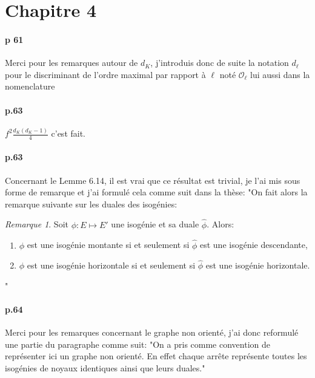 \documentclass[10pt,a4paper]{article}
\theoremstyle{plain}
\theoremstyle{definition}
\theoremstyle{definition}
\theoremstyle{definition}
\theoremstyle{definition}
\theoremstyle{definition}
\theoremstyle{remark}
\newtheorem{rem}[thm]{Remarque}
\theoremstyle{remark}
\theoremstyle{definition}
\begin{document}
\section{Chapitre 4}

\paragraph{p 61}{Merci pour les remarques autour de $d_{K}$, j'introduis donc de suite la notation $d_{\ell}$ pour le discriminant de l'ordre maximal par rapport à $\ell$ noté $\mathcal{O}_{\ell}$ lui aussi dans la nomenclature}

\paragraph{p.63}{$f^2\frac{d_K (d_K-1)}{4}$ c'est fait.}

\paragraph{p.63}{Concernant le Lemme 6.14, il est vrai que ce résultat est trivial, je l'ai mis sous forme de remarque et j'ai formulé cela comme suit dans la thèse: 
"On fait alors la remarque suivante sur les duales des isogénies:
\begin{rem}
\label{lem:dua:vol}
Soit $\phi : E \mapsto E'$ une isogénie et sa duale $\widehat{\phi}$. Alors:
\begin{enumerate}
\item $\phi$ est une isogénie montante si et seulement si $\widehat{\phi}$ est une isogénie descendante,
\item $\phi$ est une isogénie horizontale si et seulement si $\widehat{\phi}$ est une isogénie horizontale.
\end{enumerate}
\end{rem}"}

\paragraph{p.64}{Merci pour les remarques concernant le graphe non orienté, 
j'ai donc reformulé une partie du paragraphe comme suit: "On a pris comme 
convention de représenter ici un graphe non orienté. En effet chaque arrête 
représente toutes les isogénies de noyaux identiques ainsi que leurs duales."}
\end{document}
